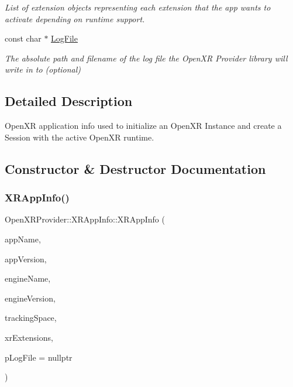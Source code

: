 \begin{DoxyCompactItemize}
\begin{DoxyCompactList}\small\item\em List of extension objects representing each extension that the app wants to activate depending on runtime support. \end{DoxyCompactList}\item 
const char $\ast$ \mbox{\hyperlink{struct_open_x_r_provider_1_1_x_r_app_info_a134d71f0d127123dc1b4b1682102b0ee}{Log\+File}}
\begin{DoxyCompactList}\small\item\em The absolute path and filename of the log file the Open\+XR Provider library will write in to (optional) \end{DoxyCompactList}\end{DoxyCompactItemize}


\subsection{Detailed Description}
Open\+XR application info used to initialize an Open\+XR Instance and create a Session with the active Open\+XR runtime. 

\subsection{Constructor \& Destructor Documentation}
\mbox{\label{struct_open_x_r_provider_1_1_x_r_app_info_ac9fbe9b0ce705d53bd0907fa997efdce}} 
\subsubsection{\texorpdfstring{XRAppInfo()}{XRAppInfo()}}
{\footnotesize\ttfamily Open\+X\+R\+Provider\+::\+X\+R\+App\+Info\+::\+X\+R\+App\+Info (\begin{DoxyParamCaption}\item[{std\+::string}]{app\+Name,  }\item[{uint32\+\_\+t}]{app\+Version,  }\item[{std\+::string}]{engine\+Name,  }\item[{uint32\+\_\+t}]{engine\+Version,  }\item[{\mbox{\hyperlink{namespace_open_x_r_provider_a005dd91723b05b123b8fccbc41798b05}{E\+X\+R\+Tracking\+Space}}}]{tracking\+Space,  }\item[{std\+::vector$<$ void $\ast$ $>$}]{xr\+Extensions,  }\item[{const char $\ast$}]{p\+Log\+File = {\ttfamily nullptr} }\end{DoxyParamCaption})\hspace{0.3cm}{\ttfamily [inline]}}

